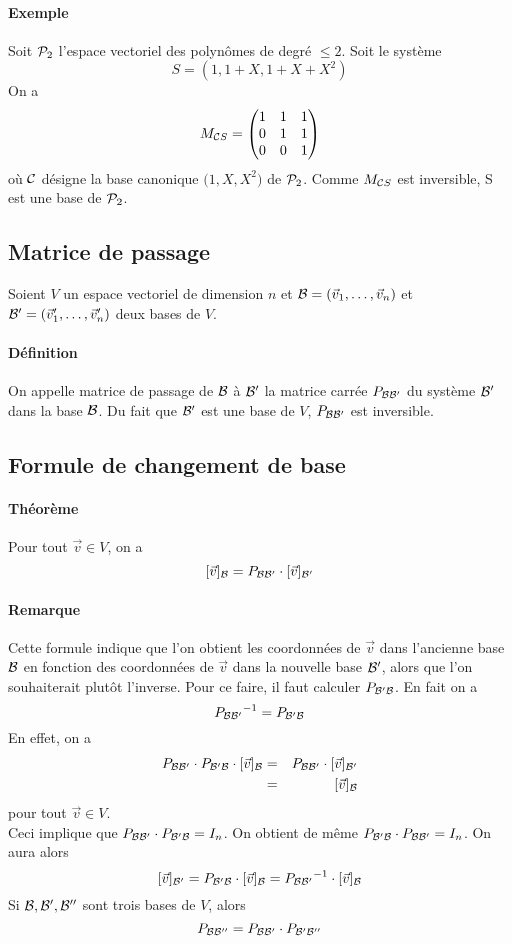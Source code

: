 \paragraph{Exemple} Soit $\mathcal{P}_2$ l'espace vectoriel des polynômes de degré $\leq 2$. Soit le système
$$S = (1, 1 + X, 1 + X + X^2)$$
On a 
$$M_{\mathcal{C} S} = \begin{pmatrix}
  1 & 1 & 1 \\
  0 & 1 & 1 \\
  0 & 0 & 1
\end{pmatrix}$$
où $\mathcal{C}$ désigne la base canonique $\big(1, X, X^2 \big)$ de $\mathcal{P}_2$. Comme $M_{\mathcal{C} S}$ est inversible, S est une base de $\mathcal{P}_2$.

%
\subsection{Matrice de passage}
%

Soient $V$ un espace vectoriel de dimension $n$ et $\mathcal{B} = (\vec{v}_1, \ldots, \vec{v}_n)$ et $\mathcal{B}' = (\vec{v}'_1, \ldots, \vec{v}'_n)$ deux bases de $V$.

\paragraph{Définition} On appelle matrice de passage de $\mathcal{B}$ à $\mathcal{B}'$ la matrice carrée $P_{\mathcal{B} \mathcal{B}'}$ du système $\mathcal{B}'$ dans la base $\mathcal{B}$. Du fait que $\mathcal{B}'$ est une base de $V$, $P_{\mathcal{B} \mathcal{B}'}$ est inversible.

%
\subsection{Formule de changement de base}
%
\paragraph{Théorème} Pour tout $\vec{v} \in V$, on a 
$$[\vec{v}]_{\mathcal{B}} = P_{\mathcal{B} \mathcal{B}'} \cdot [\vec{v}]_{\mathcal{B}'}$$

\paragraph{Remarque} Cette formule indique que l'on obtient les coordonnées de $\vec{v}$ dans l'ancienne base $\mathcal{B}$ en fonction des coordonnées de $\vec{v}$ dans la nouvelle base $\mathcal{B}'$, alors que l'on souhaiterait plutôt l'inverse. Pour ce faire, il faut calculer $P_{\mathcal{B}' \mathcal{B}}$. En fait on a
$${P_{\mathcal{B} \mathcal{B}'}}^{-1} = P_{\mathcal{B}' \mathcal{B}}$$
En effet, on a
\begin{eqnarray*}
  P_{\mathcal{B} \mathcal{B}'} \cdot P_{\mathcal{B}' \mathcal{B}} \cdot [\vec{v}]_{\mathcal{B}} &=& P_{\mathcal{B} \mathcal{B}'} \cdot [\vec{v}]_{\mathcal{B}'} \\
   &=& [\vec{v}]_{\mathcal{B}}
\end{eqnarray*}
pour tout $\vec{v} \in V$. \\
Ceci implique que $P_{\mathcal{B} \mathcal{B}'} \cdot P_{\mathcal{B}' \mathcal{B}} = I_n$. On obtient de même $P_{\mathcal{B}' \mathcal{B}} \cdot P_{\mathcal{B} \mathcal{B}'} = I_n$. On aura alors
$$[\vec{v}]_{\mathcal{B}'} = P_{\mathcal{B}' \mathcal{B}} \cdot [\vec{v}]_{\mathcal{B}} = {P_{\mathcal{B} \mathcal{B}'}}^{-1} \cdot [\vec{v}]_{\mathcal{B}}$$
Si $\mathcal{B}, \mathcal{B}', \mathcal{B}''$ sont trois bases de $V$, alors
$$P_{\mathcal{B} \mathcal{B}''} = P_{\mathcal{B} \mathcal{B}'} \cdot P_{\mathcal{B}' \mathcal{B}''}$$

